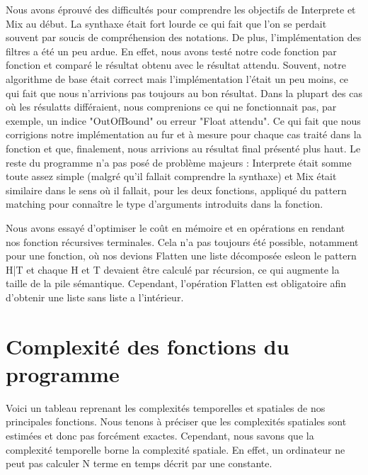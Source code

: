 \documentclass[a4paper,12pt]{article}
\begin{document}
Nous avons éprouvé des difficultés pour comprendre les objectifs de Interprete et Mix au début. La synthaxe était fort lourde ce qui fait que
l'on se perdait souvent par soucis de compréhension des notations. De plus, l'implémentation des filtres a été un peu ardue. En effet,
nous avons testé notre code fonction par fonction et comparé le résultat obtenu avec le résultat attendu. Souvent, notre algorithme de base était correct
mais l'implémentation l'était un peu moins, ce qui fait que nous n'arrivions pas toujours au bon résultat. Dans la plupart des cas où les résulatts différaient,
nous comprenions ce qui ne fonctionnait pas, par exemple, un indice "OutOfBound" ou erreur "Float attendu". Ce qui fait que nous corrigions notre implémentation
au fur et à mesure pour chaque cas traité dans la fonction et que, finalement, nous arrivions au résultat final présenté plus haut. Le reste du programme
n'a pas posé de problème majeurs : Interprete était somme toute assez simple (malgré qu'il fallait comprendre la synthaxe) et Mix était similaire dans le sens
où il fallait, pour les deux fonctions, appliqué du pattern matching pour connaître le type d'arguments introduits dans la fonction.

Nous avons essayé d'optimiser le coût en mémoire et en opérations en rendant nos fonction récursives terminales. Cela n'a pas toujours été possible,
notamment pour une fonction, où nos devions Flatten une liste décomposée esleon le pattern H|T et chaque H et T devaient être calculé par récursion,
ce qui augmente la taille de la pile sémantique. Cependant, l'opération Flatten est obligatoire afin d'obtenir une liste sans liste a l'intérieur.

\section{Complexité des fonctions du programme}

Voici un tableau reprenant les complexités temporelles et spatiales de nos principales fonctions. Nous tenons à préciser que les complexités spatiales
sont estimées et donc pas forcément exactes. Cependant, nous savons que la complexité temporelle borne la complexité spatiale. En effet, un ordinateur ne peut pas
calculer N terme en temps décrit par une constante.
\end{document}
